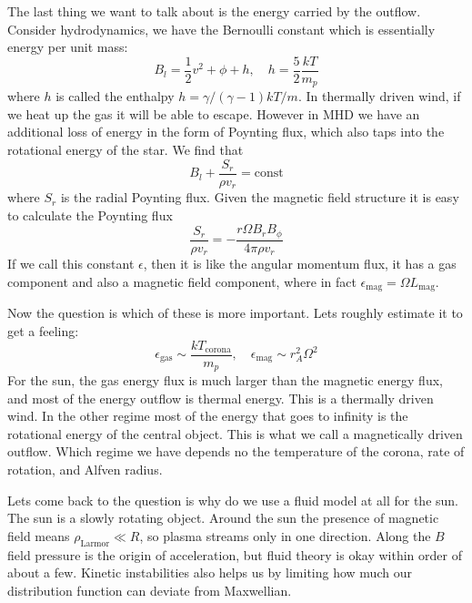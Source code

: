 \documentclass[letterpaper, 11pt]{article}
\numberwithin{equation}{section}
\numberwithin{figure}{section}
\begin{document}
The last thing we want to talk about is the energy carried by the outflow.
Consider hydrodynamics, we have the Bernoulli constant which is essentially
energy per unit mass:
\begin{equation}
  \label{eq:15}
  B_l = \frac{1}{2}v^2 + \phi + h,\quad h = \frac{5}{2}\frac{kT}{m_p}
\end{equation}
where $h$ is called the enthalpy $h = \gamma/(\gamma - 1) kT/m$. In thermally
driven wind, if we heat up the gas it will be able to escape. However in MHD we
have an additional loss of energy in the form of Poynting flux, which also taps
into the rotational energy of the star. We find that
\begin{equation}
  \label{eq:16}
  B_l + \frac{S_r}{\rho v_r} = \text{const}
\end{equation}
where $S_r$ is the radial Poynting flux. Given the magnetic field structure it
is easy to calculate the Poynting flux
\begin{equation}
  \label{eq:17}
  \frac{S_r}{\rho v_{r}} = -\frac{r\Omega B_rB_{\phi}}{4\pi \rho v_{r}}
\end{equation}
If we call this constant $\epsilon$, then it is like the angular momentum flux,
it has a gas component and also a magnetic field component, where in fact
$\epsilon_\mathrm{mag} = \Omega L_\mathrm{mag}$.

Now the question is which of these is more important. Lets roughly estimate it
to get a feeling:
\begin{equation}
  \label{eq:18}
  \epsilon_\mathrm{gas} \sim \frac{kT_\mathrm{corona}}{m_p},\quad \epsilon_\mathrm{mag} \sim r_A^2\Omega^2
\end{equation}
For the sun, the gas energy flux is much larger than the magnetic energy flux,
and most of the energy outflow is thermal energy. This is a thermally driven
wind. In the other regime most of the energy that goes to infinity is the
rotational energy of the central object. This is what we call a
magnetically driven outflow. Which regime we have depends no the
temperature of the corona, rate of rotation, and Alfven radius.

Lets come back to the question is why do we use a fluid model at all for the
sun. The sun is a slowly rotating object. Around the sun the presence of
magnetic field means $\rho_\mathrm{Larmor} \ll R$, so plasma streams only in one
direction. Along the $B$ field pressure is the origin of acceleration, but fluid
theory is okay within order of about a few. Kinetic instabilities also helps us
by limiting how much our distribution function can deviate from Maxwellian.
\end{document}
